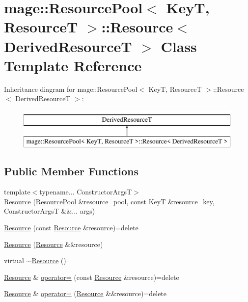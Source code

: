 \hypertarget{classmage_1_1_resource_pool_1_1_resource}{}\section{mage\+:\+:Resource\+Pool$<$ KeyT, ResourceT $>$\+:\+:Resource$<$ Derived\+ResourceT $>$ Class Template Reference}
\label{classmage_1_1_resource_pool_1_1_resource}
Inheritance diagram for mage\+:\+:Resource\+Pool$<$ KeyT, ResourceT $>$\+:\+:Resource$<$ Derived\+ResourceT $>$\+:\begin{figure}[H]
\begin{center}
\leavevmode
\includegraphics[height=2.000000cm]{classmage_1_1_resource_pool_1_1_resource}
\end{center}
\end{figure}
\subsection*{Public Member Functions}
\begin{DoxyCompactItemize}
\item 
{\footnotesize template$<$typename... Constructor\+ArgsT$>$ }\\\mbox{\hyperlink{classmage_1_1_resource_pool_1_1_resource_a552bb997277371d36aa1bf2248d83f4f}{Resource}} (\mbox{\hyperlink{classmage_1_1_resource_pool}{Resource\+Pool}} \&resource\+\_\+pool, const KeyT \&resource\+\_\+key, Constructor\+ArgsT \&\&... args)
\item 
\mbox{\hyperlink{classmage_1_1_resource_pool_1_1_resource_a783237133052c9e41b4c2d02fcdeefec}{Resource}} (const \mbox{\hyperlink{classmage_1_1_resource_pool_1_1_resource}{Resource}} \&resource)=delete
\item 
\mbox{\hyperlink{classmage_1_1_resource_pool_1_1_resource_a1c8016d99e1496da9383cbc4f727a913}{Resource}} (\mbox{\hyperlink{classmage_1_1_resource_pool_1_1_resource}{Resource}} \&\&resource)
\item 
virtual \mbox{\hyperlink{classmage_1_1_resource_pool_1_1_resource_a1d8bd565ab8769cedd94c1a42c6ebf46}{$\sim$\+Resource}} ()
\item 
\mbox{\hyperlink{classmage_1_1_resource_pool_1_1_resource}{Resource}} \& \mbox{\hyperlink{classmage_1_1_resource_pool_1_1_resource_a9c619f220b0fa676111cd24cb575dbff}{operator=}} (const \mbox{\hyperlink{classmage_1_1_resource_pool_1_1_resource}{Resource}} \&resource)=delete
\item 
\mbox{\hyperlink{classmage_1_1_resource_pool_1_1_resource}{Resource}} \& \mbox{\hyperlink{classmage_1_1_resource_pool_1_1_resource_a56f04f53400e77ddcc3c26fad1342e31}{operator=}} (\mbox{\hyperlink{classmage_1_1_resource_pool_1_1_resource}{Resource}} \&\&resource)=delete
\end{DoxyCompactItemize}
